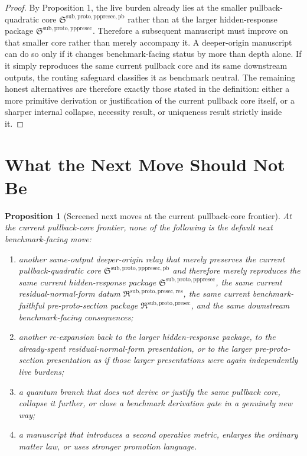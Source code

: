 \documentclass[11pt]{article}
\newcommand{\PreProtoSectionPackage}{\mathfrak R^{\mathrm{sub,proto,presec}}}
\newcommand{\PreProtoSectionResidualPackage}{\mathfrak R^{\mathrm{sub,proto,presec,res}}}
\newcommand{\PrePreProtoSectionPackage}{\mathfrak S^{\mathrm{sub,proto,pppresec}}}
\newcommand{\PrePreProtoSectionPullbackCore}{\mathfrak S^{\mathrm{sub,proto,pppresec,pb}}}
\newtheorem{proposition}{Proposition}
\begin{document}
\begin{proof}
By Proposition 1, the live burden already lies at the smaller pullback-quadratic core \(\PrePreProtoSectionPullbackCore\) rather than at the larger hidden-response package \(\PrePreProtoSectionPackage\). Therefore a subsequent manuscript must improve on that smaller core rather than merely accompany it. A deeper-origin manuscript can do so only if it changes benchmark-facing status by more than depth alone. If it simply reproduces the same current pullback core and its same downstream outputs, the routing safeguard classifies it as benchmark neutral. The remaining honest alternatives are therefore exactly those stated in the definition: either a more primitive derivation or justification of the current pullback core itself, or a sharper internal collapse, necessity result, or uniqueness result strictly inside it.
\end{proof}

\section{What the Next Move Should Not Be}

\begin{proposition}[Screened next moves at the current pullback-core frontier]
At the current pullback-core frontier, none of the following is the default next benchmark-facing move:
\begin{enumerate}
    \item another same-output deeper-origin relay that merely preserves the current pullback-quadratic core \(\PrePreProtoSectionPullbackCore\) and therefore merely reproduces the same current hidden-response package \(\PrePreProtoSectionPackage\), the same current residual-normal-form datum \(\PreProtoSectionResidualPackage\), the same current benchmark-faithful pre-proto-section package \(\PreProtoSectionPackage\), and the same downstream benchmark-facing consequences;
    \item another re-expansion back to the larger hidden-response package, to the already-spent residual-normal-form presentation, or to the larger pre-proto-section presentation as if those larger presentations were again independently live burdens;
    \item a quantum branch that does not derive or justify the same pullback core, collapse it further, or close a benchmark derivation gate in a genuinely new way;
    \item a manuscript that introduces a second operative metric, enlarges the ordinary matter law, or uses stronger promotion language.
\end{enumerate}
\end{proposition}
\end{document}
